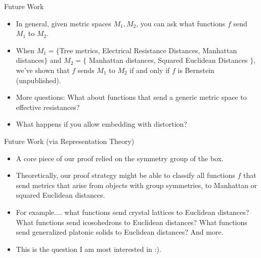 
\begin{frame}{Future Work}
  \begin{itemize}[<+->]
  \item  In general, given metric spaces $M_1, M_2$, you can ask what
  functions $f$ send $M_1$ to $M_2$.
  \item When $M_1 = \{$Tree metrics, Electrical Resistance Distances,
  Manhattan distances$\}$ and $M_2 = \{$ Manhattan distances, Squared
  Euclidean Distances $\}$, we've shown that $f$ sends $M_1$ to $M_2$
  if and only if $f$ is Bernstein (unpublished).
  \item More questions: What about functions that send a generic metric
  space to effective resistances?
  \item What happens if you allow embedding with distortion?
  \end{itemize}
\end{frame}

\begin{frame}{Future Work (via Representation Theory)}
  \begin{itemize}[<+->]
  \item  A core piece of our proof relied on the symmetry group of the
  box.
  \item Theoretically, our proof strategy might be able to classify all
  functions $f$ that send metrics that arise from objects with group
  symmetries, to Manhattan or squared Euclidean distances.
  \item For example.... what functions send crystal lattices to
  Euclidean distances? What functions send icosohedrons to Euclidean
  distances? What functions send generalized platonic solids to
  Euclidean distances? And more.
  \item This is the question I am most interested in :).
  \end{itemize}
\end{frame}

